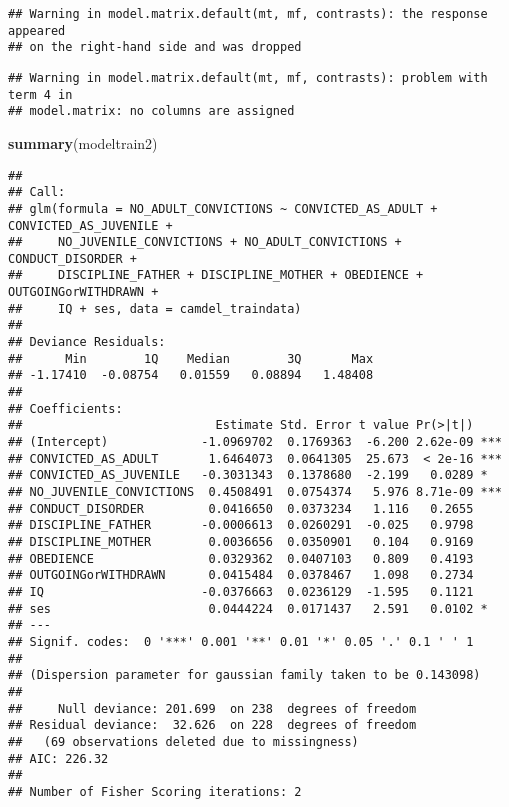 \documentclass[]{article}
\newenvironment{Shaded}{\begin{snugshade}}{\end{snugshade}}
\newcommand{\KeywordTok}[1]{\textcolor[rgb]{0.13,0.29,0.53}{\textbf{#1}}}
\newcommand{\NormalTok}[1]{#1}
\begin{document}
\begin{verbatim}
## Warning in model.matrix.default(mt, mf, contrasts): the response appeared
## on the right-hand side and was dropped
\end{verbatim}

\begin{verbatim}
## Warning in model.matrix.default(mt, mf, contrasts): problem with term 4 in
## model.matrix: no columns are assigned
\end{verbatim}

\begin{Shaded}
\begin{Highlighting}[]
\KeywordTok{summary}\NormalTok{(modeltrain2)}
\end{Highlighting}
\end{Shaded}

\begin{verbatim}
## 
## Call:
## glm(formula = NO_ADULT_CONVICTIONS ~ CONVICTED_AS_ADULT + CONVICTED_AS_JUVENILE + 
##     NO_JUVENILE_CONVICTIONS + NO_ADULT_CONVICTIONS + CONDUCT_DISORDER + 
##     DISCIPLINE_FATHER + DISCIPLINE_MOTHER + OBEDIENCE + OUTGOINGorWITHDRAWN + 
##     IQ + ses, data = camdel_traindata)
## 
## Deviance Residuals: 
##      Min        1Q    Median        3Q       Max  
## -1.17410  -0.08754   0.01559   0.08894   1.48408  
## 
## Coefficients:
##                           Estimate Std. Error t value Pr(>|t|)    
## (Intercept)             -1.0969702  0.1769363  -6.200 2.62e-09 ***
## CONVICTED_AS_ADULT       1.6464073  0.0641305  25.673  < 2e-16 ***
## CONVICTED_AS_JUVENILE   -0.3031343  0.1378680  -2.199   0.0289 *  
## NO_JUVENILE_CONVICTIONS  0.4508491  0.0754374   5.976 8.71e-09 ***
## CONDUCT_DISORDER         0.0416650  0.0373234   1.116   0.2655    
## DISCIPLINE_FATHER       -0.0006613  0.0260291  -0.025   0.9798    
## DISCIPLINE_MOTHER        0.0036656  0.0350901   0.104   0.9169    
## OBEDIENCE                0.0329362  0.0407103   0.809   0.4193    
## OUTGOINGorWITHDRAWN      0.0415484  0.0378467   1.098   0.2734    
## IQ                      -0.0376663  0.0236129  -1.595   0.1121    
## ses                      0.0444224  0.0171437   2.591   0.0102 *  
## ---
## Signif. codes:  0 '***' 0.001 '**' 0.01 '*' 0.05 '.' 0.1 ' ' 1
## 
## (Dispersion parameter for gaussian family taken to be 0.143098)
## 
##     Null deviance: 201.699  on 238  degrees of freedom
## Residual deviance:  32.626  on 228  degrees of freedom
##   (69 observations deleted due to missingness)
## AIC: 226.32
## 
## Number of Fisher Scoring iterations: 2
\end{verbatim}
\end{document}
